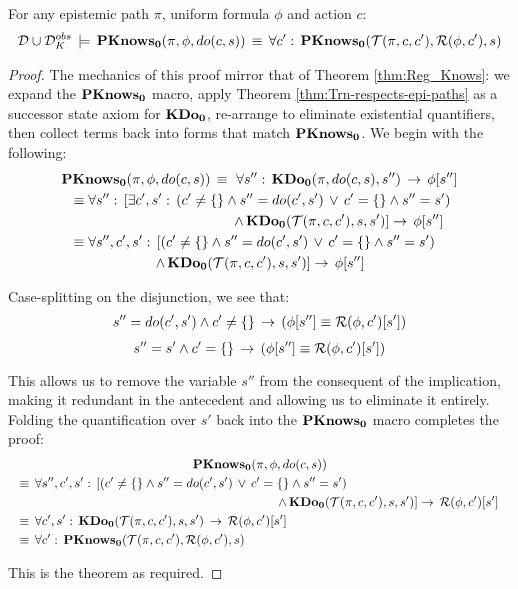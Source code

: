 \begin{thmext}
[\ref{thm:Reg_PKnowsZ}] For any epistemic path $\pi$, uniform
formula $\phi$ and action $c$:\begin{gather*}
\mathcal{D}\cup\mathcal{D}_{K}^{obs}\,\models\,\mathbf{PKnows_{0}}(\pi,\phi,do(c,s))\,\equiv\,\forall c':\,\mathbf{PKnows_{0}}(\mathcal{T}(\pi,c,c'),\mathcal{R}(\phi,c'),s)\end{gather*}

\end{thmext}
\begin{proof}
The mechanics of this proof mirror that of Theorem \ref{thm:Reg_Knows}:
we expand the $\mathbf{PKnows_{0}}$ macro, apply Theorem \ref{thm:Trn-respects-epi-paths}
as a successor state axiom for $\mathbf{KDo_{0}}$, re-arrange to eliminate existential
quantifiers, then collect terms back into forms that match $\mathbf{PKnows_{0}}$.
We begin with the following:\begin{multline*}
\PKnowsZ(\pi,\phi,do(c,s))\,\equiv\,\,\forall s'':\,\KDoZ(\pi,do(c,s),s'')\,\rightarrow\,\phi[s'']\\
\shoveleft{\equiv\forall s'':\,\left[\exists c',s':\,\left(c'\neq\{\}\wedge s''=do(c',s')\,\vee\, c'=\{\}\wedge s''=s'\right)\right.}\\
\shoveright{\left.\wedge\,\KDoZ(\Trn(\pi,c,c'),s,s')\right]\rightarrow\,\phi[s'']}\\
\shoveleft{\equiv\forall s'',c',s':\,\left[\left(c'\neq\{\}\wedge s''=do(c',s')\,\vee\, c'=\{\}\wedge s''=s'\right)\right.}\\
\left.\wedge\,\KDoZ(\Trn(\pi,c,c'),s,s')\right]\rightarrow\,\phi[s'']\end{multline*}


Case-splitting on the disjunction, we see that:\begin{gather*}
s''=do(c',s')\wedge c'\neq\{\}\,\rightarrow\,\left(\phi[s'']\equiv\mathcal{R}(\phi,c')[s']\right)\end{gather*}
\[
s''=s'\wedge c'=\{\}\,\rightarrow\,\left(\phi[s'']\equiv\mathcal{R}(\phi,c')[s']\right)\]


This allows us to remove the variable $s''$ from the consequent of
the implication, making it redundant in the antecedent and allowing
us to eliminate it entirely. Folding the quantification over $s'$
back into the $\mathbf{PKnows_{0}}$ macro completes the proof:\begin{multline*}
\PKnowsZ(\pi,\phi,do(c,s))\\
\shoveleft{\equiv\,\forall s'',c',s':\,\left[\left(c'\neq\{\}\wedge s''=do(c',s')\,\vee\, c'=\{\}\wedge s''=s'\right)\right.}\\
\shoveright{\left.\wedge\,\KDoZ(\Trn(\pi,c,c'),s,s')\right]\rightarrow\,\Reg(\phi,c')[s']}\\
\shoveleft{\equiv\,\forall c',s':\,\KDoZ(\Trn(\pi,c,c'),s,s')\,\rightarrow\,\Reg(\phi,c')[s']}\\
\shoveleft{\equiv\,\forall c':\,\PKnowsZ(\Trn(\pi,c,c'),\Reg(\phi,c'),s)}\,\,\,\,\,\,\,\,\,\,\,\,\,\,\,\,\,\,\,\,\,\,\,\,\,\,\,\,\,\,\,\,\,\,\,\,\,\,\,\,\,\,\,\,\,\,\,\,\,\,\,\,\,\,\,\,\,\,\,\,\,\,\,\,\,\,\,\,\,\,\,\,\,\,\,\,\,\,\,\,\,\,\,\,\,\,\,\,\,\,\,\,\,\,\,\,\,\,\,\,\,\,\,\,\,\,\,\,\,\,\,\,\,\,\,\,\,\,\,\,\,\,\,\,\,\,\,\end{multline*}


This is the theorem as required.
\end{proof}
